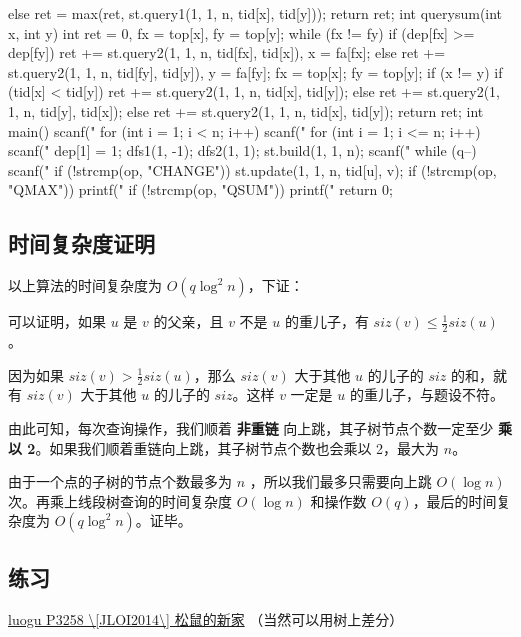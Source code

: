 \begin{cppcode}
{{  } else
    ret = max(ret, st.query1(1, 1, n, tid[x], tid[y]));
  return ret;
}
int querysum(int x, int y) {
  int ret = 0, fx = top[x], fy = top[y];
  while (fx != fy) {
    if (dep[fx] >= dep[fy])
      ret += st.query2(1, 1, n, tid[fx], tid[x]), x = fa[fx];
    else
      ret += st.query2(1, 1, n, tid[fy], tid[y]), y = fa[fy];
    fx = top[x];
    fy = top[y];
  }
  if (x != y) {
    if (tid[x] < tid[y])
      ret += st.query2(1, 1, n, tid[x], tid[y]);
    else
      ret += st.query2(1, 1, n, tid[y], tid[x]);
  } else
    ret += st.query2(1, 1, n, tid[x], tid[y]);
  return ret;
}
int main() {
  scanf("%
  for (int i = 1; i < n; i++)
    scanf("%
  for (int i = 1; i <= n; i++) scanf("%
  dep[1] = 1;
  dfs1(1, -1);
  dfs2(1, 1);
  st.build(1, 1, n);
  scanf("%
  while (q--) {
    scanf("%
    if (!strcmp(op, "CHANGE")) st.update(1, 1, n, tid[u], v);
    if (!strcmp(op, "QMAX")) printf("%
    if (!strcmp(op, "QSUM")) printf("%
  }
  return 0;
}
\end{cppcode}

\subsection{时间复杂度证明}

以上算法的时间复杂度为 $O(q \log^2 n)$，下证：

可以证明，如果 $u$ 是 $v$ 的父亲，且 $v$ 不是 $u$ 的重儿子，有 $siz(v)\le \frac{1}{2} siz(u)$。

因为如果 $siz(v)> \frac{1}{2} siz(u)$，那么 $siz(v)$ 大于其他 $u$ 的儿子的 $siz$ 的和，就有 $siz(v)$ 大于其他 $u$ 的儿子的 $siz$。这样 $v$ 一定是 $u$ 的重儿子，与题设不符。

由此可知，每次查询操作，我们顺着 \textbf{非重链} 向上跳，其子树节点个数一定至少 \textbf{乘以 2}。如果我们顺着重链向上跳，其子树节点个数也会乘以 2，最大为 $n$。

由于一个点的子树的节点个数最多为 $n$ ，所以我们最多只需要向上跳 $O(\log n)$ 次。再乘上线段树查询的时间复杂度 $O(\log n)$ 和操作数 $O(q)$，最后的时间复杂度为 $O(q \log^2 n)$。证毕。

\subsection{练习}

\href{https://www.luogu.org/problemnew/show/P3258}{luogu P3258 \textbackslash{}[JLOI2014\textbackslash{}] 松鼠的新家} （当然可以用树上差分）

